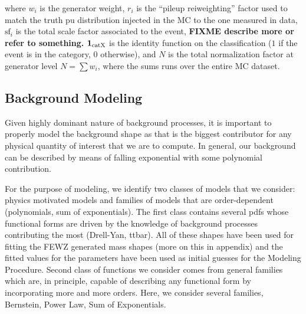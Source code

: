 where $w_i$ is the generator weight, $r_i$ is the ``pileup reiweighting'' factor used to match the truth pu distribution injected in the MC to the one measured in data,
$\text{sf}_i$ is the total scale factor associated to the event,  {\bf FIXME describe more or refer to something.}
$\mathbf{1}_\textup{catX}$ is the identity function on the classification ($1$ if the event is in the category, $0$ otherwise),
and $N$ is the total normalization factor at generator level $N=\sum w_i$, where the sums runs over the entire MC dataset.



\subsection{Background Modeling} \label{subsection:higgs_analysis_background}
%
%
Given highly dominant nature of background processes, it is important to properly model the background shape as that is the biggest contributor for any physical quantity of interest that we are to compute. In general, our background can be described by means of falling exponential with some polynomial contribution.

For the purpose of modeling, we identify two classes of models that we consider: physics motivated models and families of models that are order-dependent (polynomials, sum of exponentials). The first class contains several pdfs whose  functional forms are driven by the knowledge of background processes contributing the most (Drell-Yan, ttbar). All of these shapes have been used for fitting the FEWZ generated mass shapes (more on this in appendix) and the fitted values for the parameters have been used as initial guesses for the Modeling Procedure. Second class of functions we consider comes from general families which are, in principle, capable of describing any functional form by incorporating more and more orders. Here, we consider several families, Bernstein, Power Law, Sum of Exponentials.


